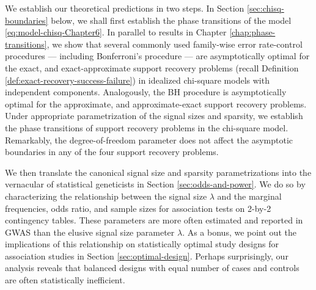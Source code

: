 We establish our theoretical predictions in two steps.
In Section \ref{sec:chisq-boundaries} below, we shall first establish the phase transitions of the model \eqref{eq:model-chisq-Chapter6}.
In parallel to results in Chapter \ref{chap:phase-transitions}, we show that several commonly used family-wise error rate-control procedures --- including Bonferroni's procedure --- are asymptotically optimal for the {exact}, and {exact-approximate} support recovery problems (recall Definition \ref{def:exact-recovery-success-failure}) in idealized chi-square models with independent components.
Analogously, the \ac{BH} procedure is asymptotically optimal for the {approximate}, and {approximate-exact} support recovery problems.
Under appropriate parametrization of the signal sizes and sparsity, we establish the phase transitions of support recovery problems in the chi-square model.
Remarkably, the degree-of-freedom parameter does not affect the asymptotic boundaries in any of the four support recovery problems.

We then translate the canonical signal size and sparsity parametrizations into the vernacular of statistical geneticists in Section \ref{sec:odds-and-power}.
We do so by characterizing the relationship between the signal size $\lambda$ and the marginal frequencies, odds ratio, and sample sizes for association tests on 2-by-2 contingency tables. 
These parameters are more often estimated and reported in \ac{GWAS} than the elusive signal size parameter $\lambda$.
As a bonus, we point out the implications of this relationship on statistically optimal study designs for association studies in Section \ref{sec:optimal-design}.
Perhaps surprisingly, our analysis reveals that balanced designs with equal number of cases and controls are often statistically inefficient.

